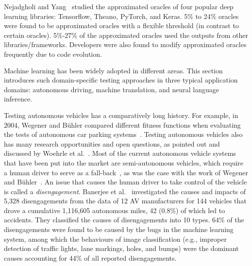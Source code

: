 Nejadgholi and Yang~ studied the approximated oracles of four popular deep learning libraries: Tensorflow, Theano, PyTorch, and Keras. 
5\% to 24\% oracles were found to be approximated oracles with a flexible threshold (in contrast to certain oracles).
5\%-27\% of the approximated oracles used the outputs from other libraries/frameworks.
Developers were also found to modify approximated oracles frequently due to code evolution.

\label{sec:applicationsenario}
Machine learning has been widely adopted in different areas.
This section introduces such domain-specific testing approaches in three typical application domains:
autonomous driving, machine translation, and neural language inference.

\label{sec:autodriving}
Testing autonomous vehicles has a comparatively long history. For example, in 2004, Wegener and B\"uhler compared different fitness functions when evaluating the tests of autonomous car parking systems~.
Testing autonomous vehicles also has many research opportunities and open questions, as pointed out and discussed by Woehrle et al.~.
Most of the current autonomous vehicle systems that have been put into the market are semi-autonomous vehicles, which require a human driver to serve as a fall-back~, as was the case with the work of Wegener and B\"uhler~.
An issue that causes the human driver to take control of the vehicle is called a \emph{disengagement}.
Banerjee et al.~ investigated the causes and impacts of 5,328 disengagements from the data of 12 AV manufacturers for 144 vehicles that drove a cumulative 1,116,605 autonomous miles, 42 (0.8\%) of which led to accidents.
They classified the causes of disengagements into 10 types.
64\% of the disengagements were found to be caused by the bugs in the machine learning system, among which the behaviours of image classification (e.g., improper detection of traffic lights, lane markings, holes, and bumps) were the dominant causes accounting for 44\% of all reported disengagements.
